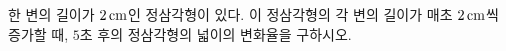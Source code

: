 한 변의 길이가 $2\mkern3mu \mathrm{cm}$인 정삼각형이 있다. 이 정삼각형의 각 변의 길이가 매초 $2\mkern3mu \mathrm{cm}$씩 증가할 때, $5$초 후의 정삼각형의 넓이의 변화율을 구하시오.
